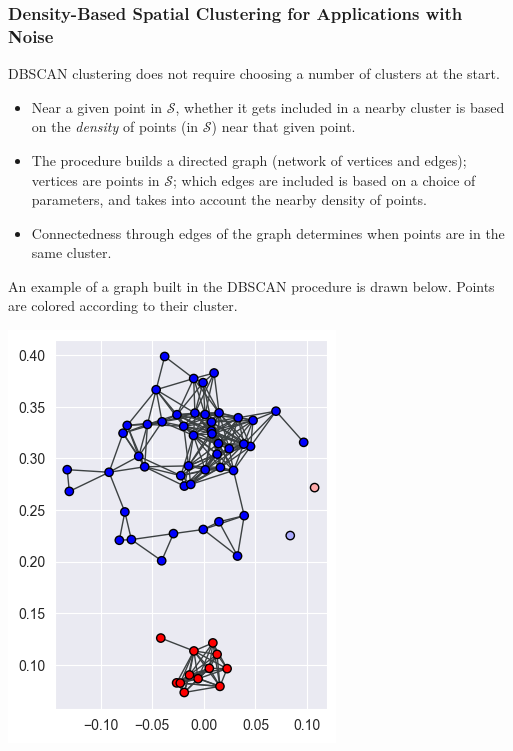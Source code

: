 \documentclass[smaller]{beamer}
\theoremstyle{example}
\begin{document}
\begin{frame}
    \frametitle{Density-Based Spatial Clustering for Applications with Noise}
    DBSCAN clustering does not require choosing a number of clusters at the start. 

    \begin{itemize}
        \item Near a given point in $\mathcal S$, whether it gets included in a nearby cluster is based on the \textit{density} of points (in $\mathcal S$) near that given point. 
        \item The procedure builds a directed graph (network of vertices and edges); vertices are points in $\mathcal S$; which edges are included is based on a choice of parameters, and takes into account the nearby density of points. 
        \item Connectedness through edges of the graph determines when points are in the same cluster.
    \end{itemize}
    An example of a graph built in the DBSCAN procedure is drawn below. Points are colored according to their cluster.

    \centering
    \includegraphics[height=0.35\textheight]{../../Images/dbscan_graph.png}
\end{frame}
\end{document}
